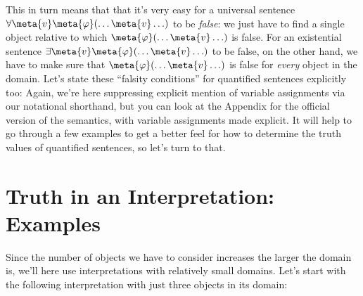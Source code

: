 This in turn means that that it's very easy for a universal sentence $\forall \meta{v}\meta{\varphi}(\ldots \meta{v} \ldots)$ to be \emph{false}: we just have to find a single object relative to which $\meta{\varphi}(\ldots \meta{v} \ldots)$ is false.  For an existential sentence $\exists \meta{v}\meta{\varphi}(\ldots \meta{v} \ldots)$ to be false, on the other hand, we have to make sure that $\meta{\varphi}(\ldots \meta{v} \ldots)$ is false for \emph{every} object in the domain. Let's state these ``falsity conditions'' for quantified sentences explicitly too:
Again, we're here suppressing explicit mention of variable assignments via our notational shorthand, but you can look at the Appendix for the official version of the semantics, with variable assignments made explicit.  It will help to go through a few examples to get a better feel for how to determine the truth values of quantified sentences, so let's turn to that.






\section{Truth in an Interpretation: Examples}

 Since the number of objects we have to consider increases the larger the domain is, we'll here use interpretations with relatively small domains.  Let's start with the following interpretation with just three objects in its domain:\\

